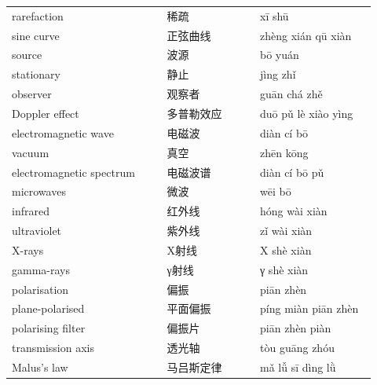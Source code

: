 \documentclass[11pt]{article}
\begin{document}
\begin{longtable}{@{}p{0.40\linewidth}p{0.24\linewidth}p{0.30\linewidth}@{}}
rarefaction & 稀疏 & xī shū \\
sine curve & 正弦曲线 & zhèng xián qū xiàn \\
source & 波源 & bō yuán \\
stationary & 静止 & jìng zhǐ \\
observer & 观察者 & guān chá zhě \\
Doppler effect & 多普勒效应 & duō pǔ lè xiào yìng \\
electromagnetic wave & 电磁波 & diàn cí bō \\
vacuum & 真空 & zhēn kōng \\
electromagnetic spectrum & 电磁波谱 & diàn cí bō pǔ \\
microwaves & 微波 & wēi bō \\
infrared & 红外线 & hóng wài xiàn \\
ultraviolet & 紫外线 & zǐ wài xiàn \\
X-rays & X射线 & X shè xiàn \\
gamma-rays & γ射线 & γ shè xiàn \\
polarisation & 偏振 & piān zhèn \\
plane-polarised & 平面偏振 & píng miàn piān zhèn \\
polarising filter & 偏振片 & piān zhèn piàn \\
transmission axis & 透光轴 & tòu guāng zhóu \\
Malus's law & 马吕斯定律 & mǎ lǚ sī dìng lǜ \\
\end{longtable}
\end{document}
